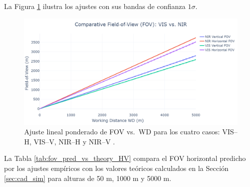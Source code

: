     La Figura \ref{fig:fov_reg_combined} ilustra los ajustes con sus bandas de confianza \(1\sigma\).
    
    \begin{figure}[H]
    \centering
      \includegraphics[width=1\linewidth]{Figures/C4/FOV.png}
      \caption{Ajuste lineal ponderado de FOV vs.\ WD para los cuatro casos: VIS–H, VIS–V, NIR–H y NIR–V .}
      \label{fig:fov_reg_combined}
    \end{figure}
    

    
    La Tabla \ref{tab:fov_pred_vs_theory_HV} compara el FOV horizontal predicho
    por los ajustes empíricos con los valores teóricos calculados en
    la Sección \ref{sec:cad_sim} para alturas de 50 m, 1000 m y 5000 m.
    

